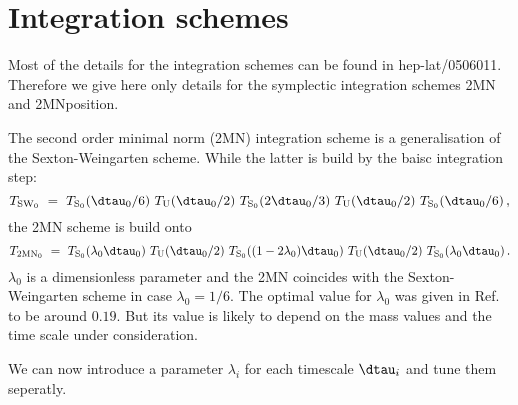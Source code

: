 \section{Integration schemes}
\label{sec:integrators}

Most of the details for the integration schemes can be found in
{\ttfamily hep-lat/0506011}. Therefore we give here only details for
the symplectic integration schemes {\ttfamily 2MN} and {\ttfamily
  2MNposition}. 

The second order minimal norm (2MN) integration scheme is a
generalisation of the Sexton-Weingarten scheme. While the latter is
build by the baisc integration step:
\begin{equation}
  \label{int:0}
  T_{\mathrm{SW}_0}\ =\ T_{\mathrm{S}_0}(\dtau_0/6)\
  T_\mathrm{U}(\dtau_0/2)\ T_{\mathrm{S}_0}(2\dtau_0/3)\
  T_\mathrm{U}(\dtau_0/2)\ T_{\mathrm{S}_0}(\dtau_0/6)\, ,
\end{equation}
the 2MN scheme is build onto
\begin{equation}
  \label{int:1}
  T_{\mathrm{2MN}_0}\ =\ T_{\mathrm{S}_0}(\lambda_0\dtau_0)\
  T_\mathrm{U}(\dtau_0/2)\ T_{\mathrm{S}_0}((1-2\lambda_0)\dtau_0)\
  T_\mathrm{U}(\dtau_0/2)\ T_{\mathrm{S}_0}(\lambda_0\dtau_0)\, .
\end{equation}
$\lambda_0$ is a dimensionless parameter and the 2MN coincides with
the Sexton-Weingarten scheme in case $\lambda_0=1/6$. The optimal
value for $\lambda_0$ was given in Ref.~\cite{Takaishi:2005tz} to be
around $0.19$. But its value is likely to depend on the mass values
and the time scale under consideration.

We can now introduce a parameter $\lambda_i$ for each timescale
$\dtau_i$ and tune them seperatly.

